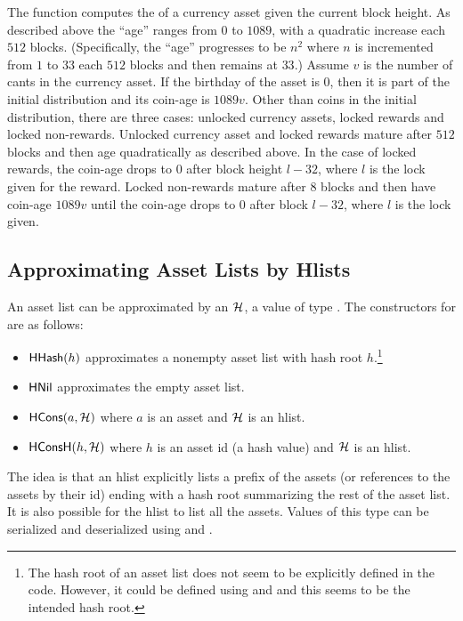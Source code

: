 The function {} computes the {} of a
currency asset given the current block height.
As described above the ``age'' ranges from $0$ to $1089$,
with a quadratic increase each $512$ blocks.
(Specifically, the ``age'' progresses to be $n^2$
where $n$ is incremented from $1$ to $33$ each $512$ blocks
and then remains at $33$.)
Assume $v$ is the number of cants in the currency asset.
If the birthday of the asset is $0$, then it is part of the initial distribution
and its coin-age is $1089 v$.
Other than coins in the initial distribution,
there are three cases: unlocked currency assets, locked rewards and locked non-rewards.
Unlocked currency asset and locked rewards mature after $512$ blocks and then age quadratically
as described above. In the case of locked rewards, the coin-age drops to $0$
after block height $l-32$, where $l$ is the lock given for the reward.
Locked non-rewards mature after $8$ blocks and then have coin-age $1089 v$
until the coin-age drops to $0$ after block $l-32$, where $l$ is the lock given.

\subsection{Approximating Asset Lists by Hlists}

An asset list can be approximated by an {} $\mathcal{H}$, a value of type {}.
The constructors for {} are as follows:
\begin{itemize}
\item ${\constr{HHash}}(h)$ approximates a nonempty asset list with hash root $h$.\footnote{The hash root of an asset list does not seem to be explicitly defined in the code. However, it could be defined using {} and {} and this seems to be the intended hash root.}
\item ${\constr{HNil}}$ approximates the empty asset list.
\item ${\constr{HCons}}(a,\cH)$ where $a$ is an asset and $\mathcal{H}$ is an hlist.
\item ${\constr{HConsH}}(h,\cH)$ where $h$ is an asset id (a hash value) and $\mathcal{H}$ is an hlist.
\end{itemize}
The idea is that an hlist explicitly lists a prefix of the assets (or references to the assets
by their id) ending with a hash root
summarizing the rest of the asset list. It is also possible for the hlist to list all the assets.
Values of this type can be serialized and deserialized using
{}
and {}.

